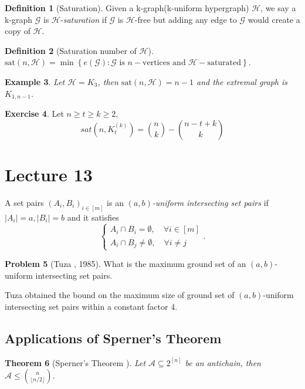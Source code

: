 \documentclass{article}
\newtheorem{theorem}{Theorem}[section]
\newtheorem{example}[theorem]{Example}
\theoremstyle{definition}
\newtheorem{definition}[theorem]{Definition}
\newtheorem{exercise}[theorem]{Exercise}
\newtheorem{problem}[theorem]{Problem}
\begin{document}
\begin{definition}[Saturation]
    Given a k-graph(k-uniform hypergraph) $\mathcal{H}$, we say a k-graph $\mathcal{G}$ is $\mathcal{H}$-\emph{saturation} if $\mathcal{G}$ is $\mathcal{H}$-free but adding any edge to $\mathcal{G}$ would create a copy of $\mathcal{H}$.
\end{definition}

\begin{definition}[Saturation number of $\mathcal{H}$]
    $\text{sat}(n,\mathcal{H})=\min \left \{e(\mathcal{G} ):\mathcal{G} \text{ is } n-\text{vertices and }   \mathcal{H}-\text{saturated}   \right \} $.
\end{definition}

\begin{example}
    Let $\mathcal{H}=K_3$, then $\text{sat}(n,\mathcal{H})=n-1$ and the extremal graph is $K_{1,n-1}$.
\end{example}

\begin{exercise}
    Let $n \ge t \ge k \ge 2$,$$sat(n,K_t^{(k)})=\binom{n}{k}-\binom{n-t+k}{k}$$
\end{exercise}

\newpage
\section{Lecture 13}

A set pairs $(A_i, B_i)_{i\in [m]}$ is an \emph{$(a,b)$-uniform intersecting set pairs} if $|A_i| = a, |B_i| = b$ and it satisfies
\[
    \left\{\begin{matrix} A_i\cap B_i =\emptyset, \quad \forall i\in \left [ m \right ] 
    \\A_i \cap B_j \neq \emptyset, \quad \forall i \neq j
    \end{matrix}\right. .
\]


\begin{problem}[Tuza \cite{tuza1985critical}, 1985]
    What is the maximum ground set of an $(a,b)$-uniform intersecting set pairs.
\end{problem}

Tuza obtained the bound on the maximum size of ground set of $(a,b)$-uniform intersecting set pairs within a constant factor 4.



\subsection{Applications of Sperner's Theorem}
\begin{theorem}[Sperner's Theorem \cite{SpernerThm}]
    Let $\mathcal{A} \subseteq 2^{[n]}$ be an antichain, then $\mathcal{A} \leq \binom{n}{\lfloor n/2 \rfloor}$.
\end{theorem}
\end{document}
